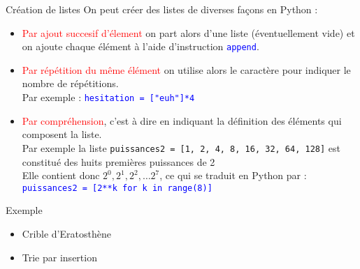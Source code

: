 \documentclass[10pt]{beamer}
\begin{document}
\begin{frame}[fragile]{\Ctitle}{\stitle}
	\begin{alertblock}{Création de listes}
		On peut créer des listes de diverses façons en Python :
		\begin{itemize}
			\item<2-> \textcolor{red}{Par ajout succesif d'élement} on part alors d'une liste (éventuellement vide) et on ajoute chaque élément à l'aide d'instruction \textcolor{blue}{\tt append}.
			\item<3-> \textcolor{red}{Par répétition du même élément} on utilise alors le caractère \textcolor{blue}{\tt *} pour indiquer le nombre de répétitions. \\
			      \onslide<4-> {Par exemple : \textcolor{blue}{\tt hesitation = ["euh"]*4}}
			\item<6->	 \textcolor{red}{Par compréhension}, c'est à dire en indiquant la définition des éléments qui composent la liste. \\
			      \onslide<7-> {Par exemple la liste {\tt puissances2 = [1, 2, 4, 8, 16, 32, 64, 128]} est constitué des huits premières puissances de 2} \\
			      \onslide<8-> {Elle contient donc $2^0, 2^1, 2^2, \dots 2^7$, ce qui se traduit en Python par :}\\
			      \onslide<9-> \textcolor{blue}{\tt puissances2 = [2**k for k in range(8)]}
		\end{itemize}
	\end{alertblock}
\end{frame}


\begin{frame}[fragile]{\Ctitle}{\stitle}
	\begin{exampleblock}{Exemple}
		\begin{itemize}
			\item<1-> Crible d'Eratosthène
			\item<5-> Trie par insertion
		\end{itemize}
	\end{exampleblock}
\end{frame}
\end{document}
